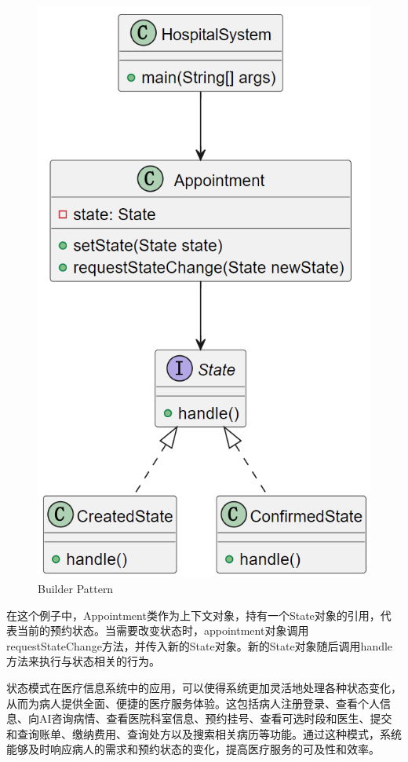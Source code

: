 \begin{figure}[htbp]
	\centering
	\includegraphics[width=0.4\textheight]{figures/11.png}
	\caption{Builder Pattern}
\end{figure}
在这个例子中，Appointment类作为上下文对象，持有一个State对象的引用，代表当前的预约状态。当需要改变状态时，appointment对象调用requestStateChange方法，并传入新的State对象。新的State对象随后调用handle方法来执行与状态相关的行为。

状态模式在医疗信息系统中的应用，可以使得系统更加灵活地处理各种状态变化，从而为病人提供全面、便捷的医疗服务体验。这包括病人注册登录、查看个人信息、向AI咨询病情、查看医院科室信息、预约挂号、查看可选时段和医生、提交和查询账单、缴纳费用、查询处方以及搜索相关病历等功能。通过这种模式，系统能够及时响应病人的需求和预约状态的变化，提高医疗服务的可及性和效率。


